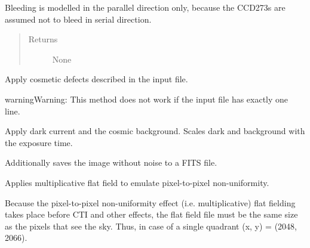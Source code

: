 \documentclass[a4paper,11pt,english]{sphinxmanual}
\begin{document}
\begin{fulllineitems}
\begin{fulllineitems}
Bleeding is modelled in the parallel direction only, because the CCD273s are assumed not to bleed in
serial direction.
\begin{quote}\begin{description}
\item[{Returns}] \leavevmode
None

\end{description}\end{quote}

\end{fulllineitems}


\begin{fulllineitems}
\label{simulator:simulator.simulator.VISsimulator.applyCosmetics}
Apply cosmetic defects described in the input file.

\begin{notice}{warning}{Warning:}
This method does not work if the input file has exactly one line.
\end{notice}

\end{fulllineitems}


\begin{fulllineitems}
\label{simulator:simulator.simulator.VISsimulator.applyDarkCurrentAndCosmicBackground}
Apply dark current and the cosmic background.
Scales dark and background with the exposure time.

Additionally saves the image without noise to a FITS file.

\end{fulllineitems}


\begin{fulllineitems}
\label{simulator:simulator.simulator.VISsimulator.applyFlatfield}
Applies multiplicative flat field to emulate pixel-to-pixel non-uniformity.

Because the pixel-to-pixel non-uniformity effect (i.e. multiplicative) flat fielding takes place
before CTI and other effects, the flat field file must be the same size as the pixels that see
the sky. Thus, in case of a single quadrant (x, y) = (2048, 2066).


\end{fulllineitems}
\end{fulllineitems}
\end{document}
